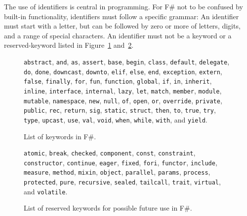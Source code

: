 The use of identifiers is central in programming. For F\# not to be confused by built-in functionality, identifiers must follow a specific grammar: An identifier must start with a letter, but can be followed by zero or more of letters, digits, and a range of special characters. An identifier must not be a keyword or a reserved-keyword listed in Figure~\ref{fig:keywords} and~\ref{fig:reservedKeywords}.
\begin{figure}
  \mbox{\lstinline{abstract},} \mbox{\lstinline{and},} \mbox{\lstinline{as},} \mbox{\lstinline{assert},} \mbox{\lstinline{base},} \mbox{\lstinline{begin},} \mbox{\lstinline{class},} \mbox{\lstinline{default},} \mbox{\lstinline{delegate},} \mbox{\lstinline{do},} \mbox{\lstinline{done},} \mbox{\lstinline{downcast},} \mbox{\lstinline{downto},} \mbox{\lstinline{elif},} \mbox{\lstinline{else},} \mbox{\lstinline{end},} \mbox{\lstinline{exception},} \mbox{\lstinline{extern},} \mbox{\lstinline{false},} \mbox{\lstinline{finally},} \mbox{\lstinline{for},} \mbox{\lstinline{fun},} \mbox{\lstinline{function},} \mbox{\lstinline{global},} \mbox{\lstinline{if},} \mbox{\lstinline{in},} \mbox{\lstinline{inherit},} \mbox{\lstinline{inline},} \mbox{\lstinline{interface},} \mbox{\lstinline{internal},} \mbox{\lstinline{lazy},} \mbox{\lstinline{let},} \mbox{\lstinline{match},} \mbox{\lstinline{member},} \mbox{\lstinline{module},} \mbox{\lstinline{mutable},} \mbox{\lstinline{namespace},} \mbox{\lstinline{new},} \mbox{\lstinline{null},} \mbox{\lstinline{of},} \mbox{\lstinline{open},} \mbox{\lstinline{or},} \mbox{\lstinline{override},} \mbox{\lstinline{private},} \mbox{\lstinline{public},} \mbox{\lstinline{rec},} \mbox{\lstinline{return},} \mbox{\lstinline{sig},} \mbox{\lstinline{static},} \mbox{\lstinline{struct},} \mbox{\lstinline{then},} \mbox{\lstinline{to},} \mbox{\lstinline{true},} \mbox{\lstinline{try},} \mbox{\lstinline{type},} \mbox{\lstinline{upcast},} \mbox{\lstinline{use},} \mbox{\lstinline{val},} \mbox{\lstinline{void},} \mbox{\lstinline{when},} \mbox{\lstinline{while},} \mbox{\lstinline{with},} and \mbox{\lstinline{yield}.}
  \caption{List of keywords in F\#.}
  \label{fig:keywords}
\end{figure}
\begin{figure}
  \mbox{\lstinline{atomic},} \mbox{\lstinline{break},} \mbox{\lstinline{checked},} \mbox{\lstinline{component},} \mbox{\lstinline{const},} \mbox{\lstinline{constraint},} \mbox{\lstinline{constructor},} \mbox{\lstinline{continue},} \mbox{\lstinline{eager},} \mbox{\lstinline{fixed},} \mbox{\lstinline{fori},} \mbox{\lstinline{functor},} \mbox{\lstinline{include},} \mbox{\lstinline{measure},} \mbox{\lstinline{method},} \mbox{\lstinline{mixin},} \mbox{\lstinline{object},} \mbox{\lstinline{parallel},} \mbox{\lstinline{params},} \mbox{\lstinline{process},} \mbox{\lstinline{protected},} \mbox{\lstinline{pure},} \mbox{\lstinline{recursive},} \mbox{\lstinline{sealed},} \mbox{\lstinline{tailcall},} \mbox{\lstinline{trait},} \mbox{\lstinline{virtual},} and \mbox{\lstinline{volatile}.}
  \caption{List of reserved keywords for possible future use in F\#.}
  \label{fig:reservedKeywords}
\end{figure} 
